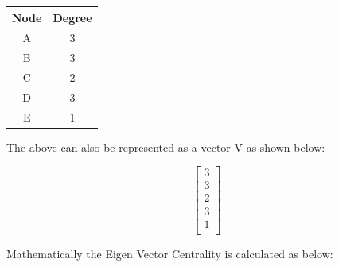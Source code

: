 \documentclass[12pt, a4paper]{article}
\begin{document}
\begin{flushleft}
    \begin{table}[h]
    \centering
    \begin{tabular}{|c|c|}
    \hline
    Node & Degree \\
    \hline
    A & 3 \\
    B & 3 \\
    C & 2 \\ 
    D & 3 \\
    E & 1 \\
    \hline
    \end{tabular}
    \end{table}
    
    The above can also be represented as a vector V as shown below:

    \begin{equation*}
    \begin{bmatrix}
    3 \\
    3 \\
    2 \\
    3 \\
    1 \\
    \end{bmatrix}
    \end{equation*}

    Mathematically the Eigen Vector Centrality is calculated as below:


\end{flushleft}
\end{document}
